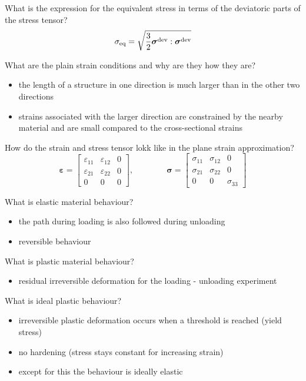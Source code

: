 \documentclass[english]{scrartcl}
\renewcommand{\vec}[1]{\boldsymbol{#1}}
\newcommand{\dev}{\text{dev}}
\newenvironment{myitemize}{ \begin{itemize}
		\setlength{\itemsep}{0pt}
		\setlength{\parskip}{0pt}
		\setlength{\parsep}{0pt}     }
	{ \end{itemize}                  }
\begin{document}
What is the expression for the equivalent stress in terms of the deviatoric parts of the stress tensor?
\begin{equation*}
\sigma_{\text{eq}} = \sqrt{\dfrac{3}{2} \vec{\sigma}^{\text{\dev}} : \vec{\sigma}^{\text{\dev}}}
\end{equation*}

What are the plain strain conditions and why are they how they are?
\begin{myitemize}
	\item the length of a structure in one direction is much larger than in the other two directions
	\item strains associated with the larger direction are constrained by the nearby material and are small compared to the cross-sectional strains
\end{myitemize}

How do the strain and stress tensor lokk like in the plane strain approximation?
\begin{equation*}
\vec{\varepsilon} = \begin{bmatrix}
\varepsilon_{11}	& \varepsilon_{12}	 & 0	 \\ 
\varepsilon_{21}	& \varepsilon_{22}	 & 0	 \\ 
0	& 0	 & 0	
\end{bmatrix},  \qquad \qquad 
\vec{\sigma} = \begin{bmatrix}
\sigma_{11}	& \sigma_{12}	 & 0	 \\ 
\sigma_{21}	& \sigma_{22}	 & 0	 \\ 
0	& 0 & \sigma_{33}	
\end{bmatrix} 
\end{equation*}

What is elastic material behaviour?
\begin{myitemize}
	\item the path during loading is also followed during unloading
	\item reversible behaviour
\end{myitemize}


What is plastic material behaviour?
\begin{myitemize}
	\item residual irreversible deformation for the loading - unloading experiment
\end{myitemize}


What is ideal plastic behaviour?
\begin{myitemize}
	\item irreversible plastic deformation occurs when a threshold is reached (yield stress) 
	\item no hardening (stress stays constant for increasing strain)
	\item except for this the behaviour is ideally elastic 
\end{myitemize}
\end{document}
